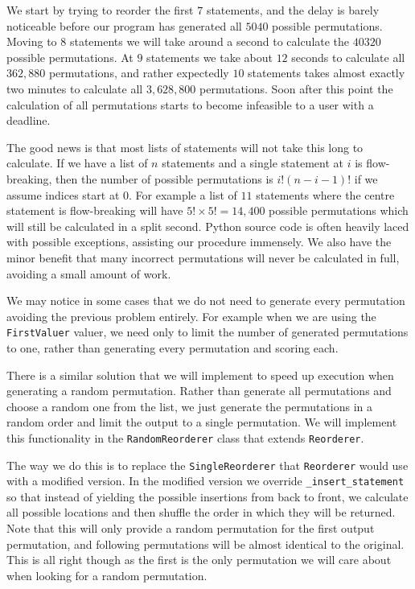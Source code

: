 \documentclass[twoside,a4paper]{report}
\begin{document}
We start by trying to reorder the first $7$ statements, and the delay is barely noticeable before our program has generated all $5040$ possible permutations.
Moving to $8$ statements we will take around a second to calculate the $40320$ possible permutations. At $9$ statements we take about $12$ seconds to calculate
all $362,880$ permutations, and rather expectedly $10$ statements takes almost exactly two minutes to calculate all $3,628,800$ permutations. Soon after this
point the calculation of all permutations starts to become infeasible to a user with a deadline.

The good news is that most lists of statements will not take this long to calculate. If we have a list of $n$ statements and a single statement at $i$ is
flow-breaking, then the number of possible permutations is $i!(n-i-1)!$ if we assume indices start at $0$. For example a list of $11$ statements where the
centre statement is flow-breaking will have $5! \times 5! = 14,400$ possible permutations which will still be calculated in a split second. Python source
code is often heavily laced with possible exceptions, assisting our procedure immensely. We also have the minor benefit that many incorrect permutations
will never be calculated in full, avoiding a small amount of work.

We may notice in some cases that we do not need to generate every permutation avoiding the previous problem entirely. For example when we are using the
\texttt{FirstValuer} valuer, we need only to limit the number of generated permutations to one, rather than generating every permutation and scoring each.

There is a similar solution that we will implement to speed up execution when generating a random permutation. Rather than generate all permutations and
choose a random one from the list, we just generate the permutations in a random order and limit the output to a single permutation. We will implement this
functionality in the \texttt{RandomReorderer} class that extends \texttt{Reorderer}.

The way we do this is to replace the \texttt{SingleReorderer} that \texttt{Reorderer} would use with a modified version. In the modified version we override
\texttt{\_insert\_statement} so that instead of yielding the possible insertions from back to front, we calculate all possible locations and then shuffle
the order in which they will be returned. Note that this will only provide a random permutation for the first output permutation, and following permutations
will be almost identical to the original. This is all right though as the first is the only permutation we will care about when looking for a random
permutation.
\end{document}
